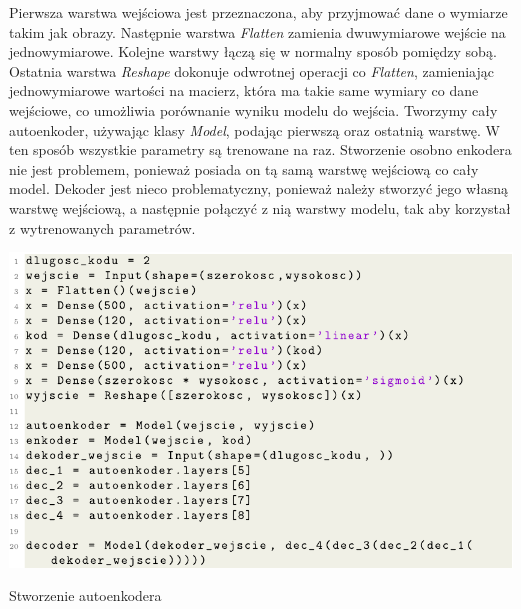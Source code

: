 \documentclass[a4paper,12pt,oneside]{book} %
\begin{document}
Pierwsza warstwa wejściowa jest przeznaczona, aby przyjmować dane o wymiarze takim jak obrazy. Następnie warstwa \textit{Flatten} zamienia dwuwymiarowe wejście na jednowymiarowe. Kolejne warstwy łączą się w normalny sposób pomiędzy sobą. Ostatnia warstwa \textit{Reshape} dokonuje odwrotnej operacji co \textit{Flatten}, zamieniając jednowymiarowe wartości na macierz, która ma takie same wymiary co dane wejściowe, co umożliwia porównanie wyniku modelu do wejścia. Tworzymy cały autoenkoder, używając klasy \textit{Model}, podając pierwszą oraz ostatnią warstwę. W ten sposób wszystkie parametry są trenowane na raz. Stworzenie osobno enkodera nie jest problemem, ponieważ posiada on tą samą warstwę wejściową co cały model. Dekoder jest nieco problematyczny, ponieważ należy stworzyć jego własną warstwę wejściową, a następnie połączyć z nią warstwy modelu, tak aby korzystał z wytrenowanych parametrów. 
\begin{code}[h!]
	\centering
	\includegraphics[width=\linewidth]{modelae.pdf}
	\caption{Stworzenie autoenkodera}
	\label{code:createae}
\end{code}
\end{document}

